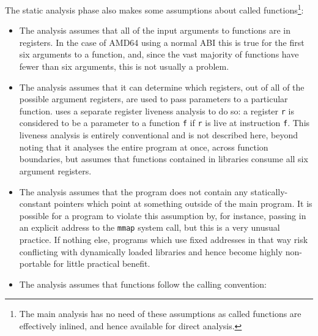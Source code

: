 The static analysis phase also makes some assumptions about called
functions\footnote{The main analysis has no need of these assumptions
  as called functions are effectively inlined, and hence available for
  direct analysis.}:

\begin{itemize}
\item
  The analysis assumes that all of the input arguments to functions
  are in registers.  In the case of AMD64 using a normal ABI this is
  true for the first six arguments to a function, and, since the vast
  majority of functions have fewer than six arguments, this is not
  usually a problem.  

\item
  The analysis assumes that it can determine which registers, out of
  all of the possible argument registers, are used to pass parameters
  to a particular function.  {\Implementation} uses a separate
  register liveness analysis to do so: a register \verb|r| is
  considered to be a parameter to a function \verb|f| if \verb|r| is
  live at instruction \verb|f|.  This liveness analysis is entirely
  conventional and is not described here, beyond noting that it
  analyses the entire program at once, across function boundaries, but
  assumes that functions contained in libraries consume all six
  argument registers.

\item
  The analysis assumes that the program does not contain any
  statically-constant pointers which point at something outside of the
  main program.  It is possible for a program to violate this
  assumption by, for instance, passing in an explicit address to the
  \verb|mmap| system call, but this is a very unusual practice.  If
  nothing else, programs which use fixed addresses in that way risk
  conflicting with dynamically loaded libraries and hence become
  highly non-portable for little practical benefit.

\item
  The analysis assumes that functions follow the calling convention:


\end{itemize}
